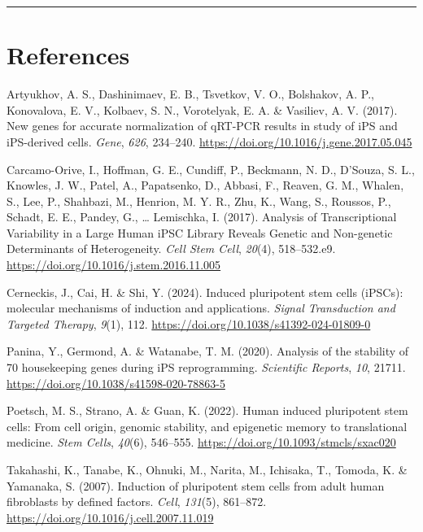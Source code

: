 \documentclass[
  letterpaper,
  DIV=11,
  numbers=noendperiod]{scrartcl}
\newlength{\cslhangindent}
\newenvironment{CSLReferences}[2] %
 {\begin{list}{}{%
  \setlength{\itemindent}{0pt}
  \setlength{\leftmargin}{0pt}
  \setlength{\parsep}{0pt}
  \ifodd #1
   \setlength{\leftmargin}{\cslhangindent}
   \setlength{\itemindent}{-1\cslhangindent}
  \fi
  \setlength{\itemsep}{#2\baselineskip}}}
 {\end{list}}
\begin{document}
\begin{center}\rule{0.5\linewidth}{0.5pt}\end{center}

\section*{References}\label{references}

\label{refs}
\begin{CSLReferences}{1}{0}
Artyukhov, A. S., Dashinimaev, E. B., Tsvetkov, V. O., Bolshakov, A. P.,
Konovalova, E. V., Kolbaev, S. N., Vorotelyak, E. A. \& Vasiliev, A. V.
(2017). New genes for accurate normalization of qRT-PCR results in study
of iPS and iPS-derived cells. \emph{Gene}, \emph{626}, 234--240.
\url{https://doi.org/10.1016/j.gene.2017.05.045}

Carcamo-Orive, I., Hoffman, G. E., Cundiff, P., Beckmann, N. D.,
D'Souza, S. L., Knowles, J. W., Patel, A., Papatsenko, D., Abbasi, F.,
Reaven, G. M., Whalen, S., Lee, P., Shahbazi, M., Henrion, M. Y. R.,
Zhu, K., Wang, S., Roussos, P., Schadt, E. E., Pandey, G., \ldots{}
Lemischka, I. (2017). Analysis of Transcriptional Variability in a Large
Human iPSC Library Reveals Genetic and Non-genetic Determinants of
Heterogeneity. \emph{Cell Stem Cell}, \emph{20}(4), 518--532.e9.
\url{https://doi.org/10.1016/j.stem.2016.11.005}

Cerneckis, J., Cai, H. \& Shi, Y. (2024). Induced pluripotent stem cells
(iPSCs): molecular mechanisms of induction and applications.
\emph{Signal Transduction and Targeted Therapy}, \emph{9}(1), 112.
\url{https://doi.org/10.1038/s41392-024-01809-0}

Panina, Y., Germond, A. \& Watanabe, T. M. (2020). Analysis of the
stability of 70 housekeeping genes during iPS reprogramming.
\emph{Scientific Reports}, \emph{10}, 21711.
\url{https://doi.org/10.1038/s41598-020-78863-5}

Poetsch, M. S., Strano, A. \& Guan, K. (2022). Human induced pluripotent
stem cells: From cell origin, genomic stability, and epigenetic memory
to translational medicine. \emph{Stem Cells}, \emph{40}(6), 546--555.
\url{https://doi.org/10.1093/stmcls/sxac020}

Takahashi, K., Tanabe, K., Ohnuki, M., Narita, M., Ichisaka, T., Tomoda,
K. \& Yamanaka, S. (2007). Induction of pluripotent stem cells from
adult human fibroblasts by defined factors. \emph{Cell}, \emph{131}(5),
861--872. \url{https://doi.org/10.1016/j.cell.2007.11.019}


\end{CSLReferences}
\end{document}
